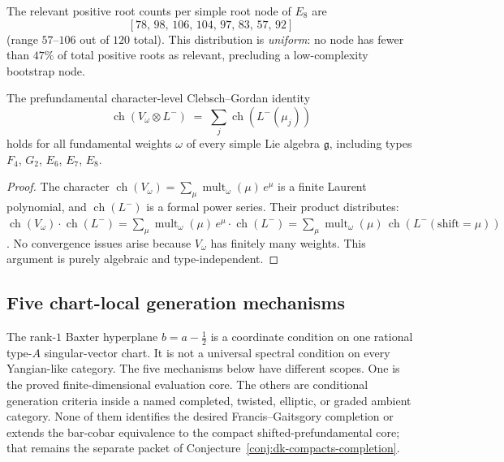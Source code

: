 \begin{proposition}
\label{prop:e8-root-uniformity}
\ClaimStatusProvedHere
The relevant positive root counts per simple root node of $E_8$ are
\[
[78,\, 98,\, 106,\, 104,\, 97,\, 83,\, 57,\, 92]
\]
(range $57$--$106$ out of $120$ total). This distribution is \emph{uniform}: no node has fewer than $47\%$ of total positive roots as relevant, precluding a low-complexity bootstrap node.
\end{proposition}

\begin{proposition}
\label{prop:character-cg-all-types}
\ClaimStatusProvedHere
The prefundamental character-level Clebsch--Gordan identity
\[
\operatorname{ch}(V_\omega \otimes L^-) \;=\; \sum_{j} \operatorname{ch}(L^-(\mu_j))
\]
holds for all fundamental weights $\omega$ of every simple Lie algebra $\mathfrak{g}$, including types $F_4$, $G_2$, $E_6$, $E_7$, $E_8$.
\end{proposition}

\begin{proof}
The character $\operatorname{ch}(V_\omega) = \sum_\mu
\operatorname{mult}_\omega(\mu)\, e^\mu$ is a finite Laurent
polynomial, and $\operatorname{ch}(L^-)$ is a formal power series.
Their product distributes:
$\operatorname{ch}(V_\omega) \cdot \operatorname{ch}(L^-)
= \sum_\mu \operatorname{mult}_\omega(\mu)\,
e^\mu \cdot \operatorname{ch}(L^-)
= \sum_\mu \operatorname{mult}_\omega(\mu)\,
\operatorname{ch}(L^-(\mathrm{shift} = \mu))$.
No convergence issues arise because $V_\omega$ has finitely many
weights. This argument is purely algebraic and type-independent.
\end{proof}

\subsection{Five chart-local generation mechanisms}
\label{sec:mc3-five-family-strengthening}

The rank-$1$ Baxter hyperplane $b = a - \tfrac12$ is a
coordinate condition on one rational type-$A$ singular-vector chart.
It is not a universal spectral condition on every Yangian-like
category. The five mechanisms below have different scopes. One is the
proved finite-dimensional evaluation core. The others are conditional
generation criteria inside a named completed, twisted, elliptic, or
graded ambient category. None of them identifies the desired
Francis--Gaitsgory completion or extends the bar-cobar equivalence to
the compact shifted-prefundamental core; that remains the separate
packet of Conjecture~\ref{conj:dk-compacts-completion}.

